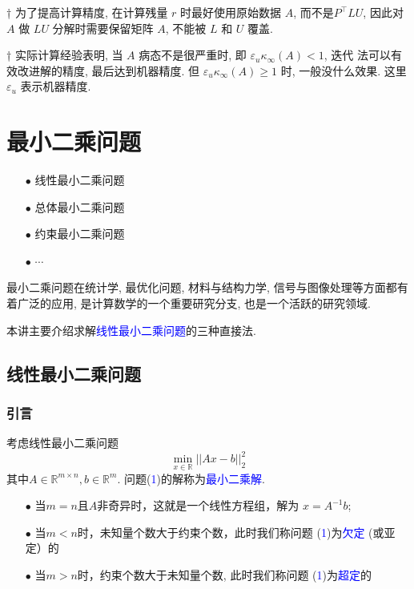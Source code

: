 \documentclass[12pt,a4paper]{article}
\begin{document}
† 为了提高计算精度, 在计算残量 $r$ 时最好使用原始数据 $A$, 而不是$P^{\top}LU$, 因此对 $A$ 做 $LU$ 分解时需要保留矩阵 $A$, 不能被 $L$ 和 $U$ 覆盖.

† 实际计算经验表明, 当 $A$ 病态不是很严重时, 即 $ε_uκ_∞(A) < 1$, 迭代
法可以有效改进解的精度, 最后达到机器精度. 但 $ε_uκ_∞(A) ≥ 1$ 时,
一般没什么效果. 这里 $ε_u$ 表示机器精度.

\chapter{最小二乘问题}
\begin{itemize}     
	\item[$\bullet$]线性最小二乘问题
	\item[$\bullet$]总体最小二乘问题
	\item[$\bullet$]约束最小二乘问题
	\item[$\bullet$]$\cdots$
\end{itemize}

最小二乘问题在统计学, 最优化问题, 材料与结构力学, 信号与图像处理等方面都有着广泛的应用, 是计算数学的一个重要研究分支, 也是一个活跃的研究领域.

本讲主要介绍求解\textcolor{blue}{线性最小二乘问题}的三种直接法.

\section{线性最小二乘问题}

\subsection{引言}
\noindent 考虑线性最小二乘问题
\begin{equation}
\min_{x\in\mathbb{R}} ||Ax-b||_2^2
\end{equation}
其中$A\in\mathbb{R}^{m\times n},b\in\mathbb{R}^m$.
问题(\textcolor{blue}{1})的解称为\textcolor{blue}{最小二乘解}.
\begin{itemize}
	\item[$\bullet$]当$m=n$且$A$非奇异时，这就是一个线性方程组，解为        $x=A^{-1}b$;
	\item[$\bullet$]当$m<n$时，未知量个数大于约束个数，此时我们称问题
	(\textcolor{blue}{1})为\textcolor{blue}{欠定}
	(或亚定）的
	\item[$\bullet$]当$m>n$时，约束个数大于未知量个数, 此时我们称问题
	(\textcolor{blue}{1})为\textcolor{blue}{超定}的
\end{itemize}
\end{document}
